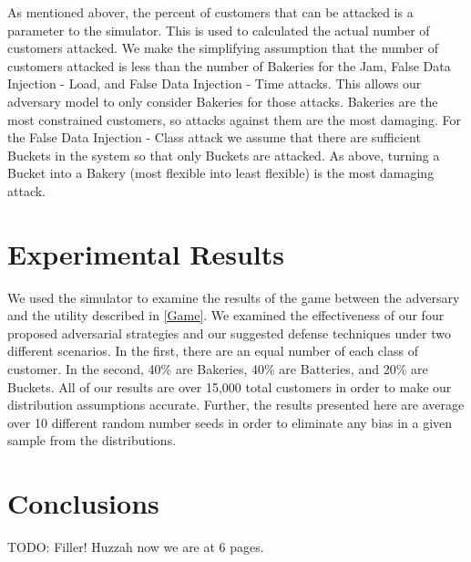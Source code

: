 \documentclass[conference]{IEEEtran}
\begin{document}
As mentioned abover, the percent of customers that can be attacked is a parameter to the simulator.  This is used to calculated the actual number of customers attacked.  We make the simplifying assumption that the number of customers attacked is less than the number of Bakeries for the Jam, False Data Injection - Load, and False Data Injection - Time attacks.  This allows our adversary model to only consider Bakeries for those attacks.  Bakeries are the most constrained customers, so attacks against them are the most damaging.  For the False Data Injection - Class attack we assume that there are sufficient Buckets in the system so that only Buckets are attacked.  As above, turning a Bucket into a Bakery (most flexible into least flexible) is the most damaging attack.

\section{Experimental Results}
\label{Experimental Results}

We used the simulator to examine the results of the game between the adversary and the utility described in \ref{Game}.  We examined the effectiveness of our four proposed adversarial strategies and our suggested defense techniques under two different scenarios.  In the first, there are an equal number of each class of customer.  In the second, 40\% are Bakeries, 40\% are Batteries, and 20\% are Buckets.  All of our results are over 15,000 total customers in order to make our distribution assumptions accurate.  Further, the results presented here are average over 10 different random number seeds in order to eliminate any bias in a given sample from the distributions.


\section{Conclusions}
\label{Conclusions}

TODO:  Filler!  Huzzah now we are at 6 pages.



\end{document}
